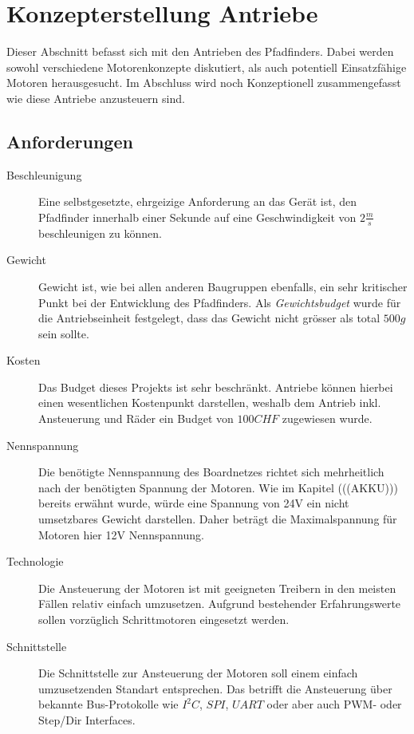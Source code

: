 \documentclass[main.tex]{subfiles} %
\begin{document}
\section{Konzepterstellung Antriebe}

Dieser Abschnitt befasst sich mit den Antrieben des Pfadfinders. Dabei werden
sowohl verschiedene Motorenkonzepte diskutiert, als auch potentiell
Einsatzfähige Motoren herausgesucht. Im Abschluss wird noch Konzeptionell
zusammengefasst wie diese Antriebe anzusteuern sind.

\subsection*{Anforderungen}

\begin{description}
    \item[Beschleunigung] Eine selbstgesetzte, ehrgeizige Anforderung an das Gerät ist,
          den Pfadfinder innerhalb einer Sekunde auf eine Geschwindigkeit von $2
              \frac{m}{s} $ beschleunigen zu können.

    \item[Gewicht] Gewicht ist, wie bei allen anderen Baugruppen ebenfalls, ein sehr
          kritischer Punkt bei der Entwicklung des Pfadfinders. Als
          \textit{Gewichtsbudget} wurde für die Antriebseinheit festgelegt, dass das
          Gewicht nicht grösser als total $500 g$ sein sollte.

    \item[Kosten] Das Budget dieses Projekts ist sehr beschränkt. Antriebe können hierbei
          einen wesentlichen Kostenpunkt darstellen, weshalb dem Antrieb inkl.
          Ansteuerung und Räder ein Budget von $100 CHF$ zugewiesen wurde.

    \item[Nennspannung] Die benötigte Nennspannung des Boardnetzes richtet sich
          mehrheitlich nach der benötigten Spannung der Motoren. Wie im Kapitel
          (((AKKU))) bereits erwähnt wurde, würde eine Spannung von 24V ein nicht
          umsetzbares Gewicht darstellen. Daher beträgt die Maximalspannung für Motoren
          hier 12V Nennspannung.

    \item[Technologie] Die Ansteuerung der Motoren ist mit geeigneten Treibern in den
          meisten Fällen relativ einfach umzusetzen. Aufgrund bestehender Erfahrungswerte
          sollen vorzüglich Schrittmotoren eingesetzt werden.

    \item[Schnittstelle] Die Schnittstelle zur Ansteuerung der Motoren soll einem einfach
          umzusetzenden Standart entsprechen. Das betrifft die Ansteuerung über bekannte
          Bus-Protokolle wie $I^2C$, $SPI$, $UART$ oder aber auch PWM- oder Step/Dir
          Interfaces.

\end{description}
\end{document}
